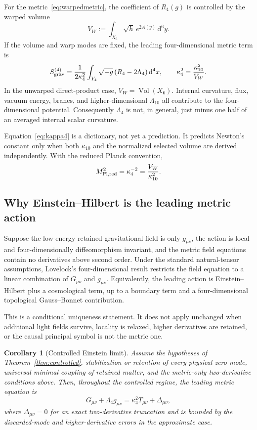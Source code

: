 \documentclass[11pt,a4paper]{article}
\newtheorem{corollary}[theorem]{Corollary}
\theoremstyle{definition}
\theoremstyle{remark}
\newcommand{\dd}{\mathrm d}
\begin{document}
For the metric~\eqref{eq:warpedmetric}, the coefficient of \(R_4(g)\) is
controlled by the warped volume
\begin{equation}
 V_W:=\int_{X_6}\sqrt{h}\,e^{2A(y)}\,\dd^6y .
\label{eq:VW}
\end{equation}
If the volume and warp modes are fixed, the leading four-dimensional metric
term is
\begin{equation}
 S_{\rm grav}^{(4)}
 =\frac{1}{2\kappa_4^2}
 \int_{Y_4}\sqrt{-g}\,(R_4-2\Lambda_4)\,\dd^4x,
\qquad
 \kappa_4^2=\frac{\kappa_{10}^2}{V_W}.
\label{eq:kappa4}
\end{equation}
In the unwarped direct-product case, \(V_W=\operatorname{Vol}(X_6)\).
Internal curvature, flux, vacuum energy, branes, and higher-dimensional
\(\Lambda_{10}\) all contribute to the four-dimensional potential.
Consequently \(\Lambda_4\) is not, in general, just minus one half of an
averaged internal scalar curvature.

Equation~\eqref{eq:kappa4} is a dictionary, not yet a prediction.  It predicts
Newton's constant only when both \(\kappa_{10}\) and the normalized selected
volume are derived independently.  With the reduced Planck convention,
\[
 M_{\rm Pl,red}^{2}
 =\kappa_4^{-2}
 =\frac{V_W}{\kappa_{10}^{2}}.
\]

\subsection{Why Einstein--Hilbert is the leading metric action}

Suppose the low-energy retained gravitational field is only \(g_{\mu\nu}\),
the action is local and four-dimensionally diffeomorphism invariant, and the
metric field equations contain no derivatives above second order.  Under the
standard natural-tensor assumptions, Lovelock's four-dimensional result
restricts the field equation to a linear combination of
\(G_{\mu\nu}\) and \(g_{\mu\nu}\).  Equivalently, the leading action is
Einstein--Hilbert plus a cosmological term, up to a boundary term and a
four-dimensional topological Gauss--Bonnet contribution.

This is a conditional uniqueness statement.  It does not apply unchanged
when additional light fields survive, locality is relaxed, higher derivatives
are retained, or the causal principal symbol is not the metric one.

\begin{corollary}[Controlled Einstein limit]
\label{cor:GR}
Assume the hypotheses of Theorem~\ref{thm:controlled}, stabilization or
retention of every physical zero mode, universal minimal coupling of retained
matter, and the metric-only two-derivative conditions above.  Then, throughout
the controlled regime, the leading metric equation is
\begin{equation}
 G_{\mu\nu}+\Lambda_4g_{\mu\nu}
 =\kappa_4^2T_{\mu\nu}
 +\Delta_{\mu\nu},
\label{eq:einstein}
\end{equation}
where \(\Delta_{\mu\nu}=0\) for an exact two-derivative truncation and is
bounded by the discarded-mode and higher-derivative errors in the approximate
case.
\end{corollary}
\end{document}
